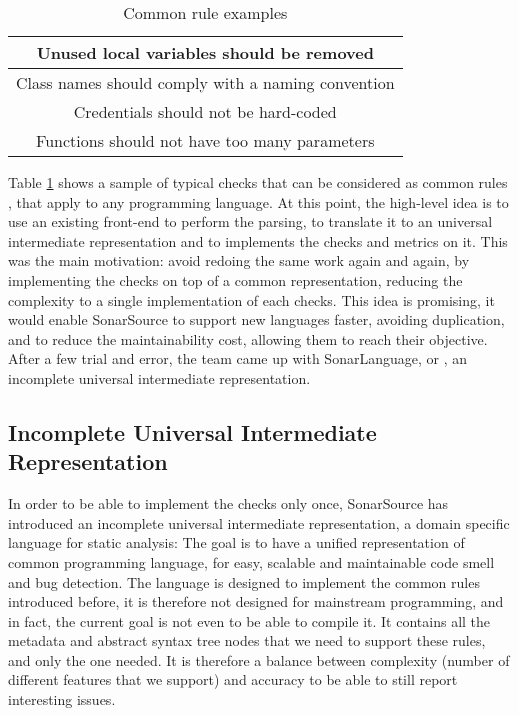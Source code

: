 \begin{table}[h]
\centering
\caption{Common rule examples}
\label{table:common_rules}
	\begin{tabular}{|c|}
		\hline
		Unused local variables should be removed  \\ \hline
		Class names should comply with a naming convention \\ \hline
		Credentials should not be hard-coded \\ \hline
		Functions should not have too many parameters \\ \hline
	\end{tabular}
\end{table}

Table \ref{table:common_rules} shows a sample of typical checks that can be considered as common rules \cite{JiraSonarSource:2019:Online}, that apply to any programming language.
At this point, the high-level idea is to use an existing front-end to perform the parsing, to translate it to an universal intermediate representation and to implements the checks and metrics on it.
This was the main motivation: avoid redoing the same work again and again, by implementing the checks on top of a common representation, reducing the complexity to a single implementation of each checks.
This idea is promising, it would enable SonarSource to support new languages faster, avoiding duplication, and to reduce the maintainability cost, allowing them to reach their objective.
After a few trial and error, the team came up with SonarLanguage, or \slang{}, an incomplete universal intermediate representation. 


\subsection{Incomplete Universal Intermediate Representation}
\label{subsec:slang}

In order to be able to implement the checks only once, SonarSource has introduced an incomplete universal intermediate representation, a domain specific language for static analysis: \textbf{\slang{}}
The goal is to have a unified representation of common programming language, for easy, scalable and maintainable code smell and bug detection. 
The language is designed to implement the common rules introduced before, it is therefore not designed for mainstream programming, and in fact, the current goal is not even to be able to compile it.
It contains all the metadata and abstract syntax tree nodes that we need to support these rules, and only the one needed.
It is therefore a balance between complexity (number of different features that we support) and accuracy to be able to still report interesting issues. 

